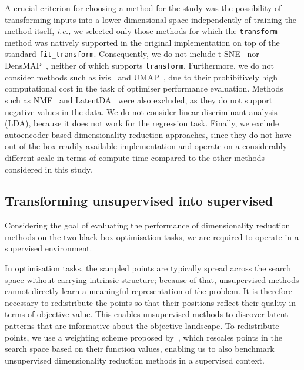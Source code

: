 A crucial criterion for choosing a method for the study was the possibility of transforming inputs into a lower-dimensional space independently of training the method itself, \emph{i.e.,} we selected only those methods for which the \texttt{transform} method was natively supported in the original implementation on top of the standard \texttt{fit\_transform}.
Consequently, we do not include t-SNE~\citep{VanHin08} nor DensMAP~\citep{NarEtAl21}, neither of which supports \texttt{transform}.
Furthermore, we do not consider methods such as ivis~\citep{SzuEtAl19} and UMAP~\citep{SaiEtAl21}, due to their prohibitively high computational cost in the task of optimiser performance evaluation.
Methods such as NMF~\citep{LeeSeu00} and LatentDA~\citep{BleEtAl03} were also excluded, as they do not support negative values in the data.
We do not consider linear discriminant analysis (LDA), because it does not work for the regression task.
Finally, we exclude autoencoder-based dimensionality reduction approaches, since they do not have out-of-the-box readily available implementation and operate on a considerably different scale in terms of compute time compared to the other methods considered in this study.











\subsection{Transforming unsupervised into supervised}
\label{sec:ch04:transform}



Considering the goal of evaluating the performance of dimensionality reduction methods on the two black-box optimisation tasks, we are required to operate in a supervised environment.


In optimisation tasks, the sampled points are typically spread across the search space without carrying intrinsic structure; because of that, unsupervised methods cannot directly learn a meaningful representation of the problem. It is therefore necessary to redistribute the points so that their positions reflect their quality in terms of objective value. This enables unsupervised methods to discover latent patterns that are informative about the objective landscape.
To redistribute points, we use a weighting scheme proposed by~\citet{RapEtAl20}, which rescales points in the search space based on their function values, enabling us to also benchmark unsupervised dimensionality reduction methods in a supervised context. 

